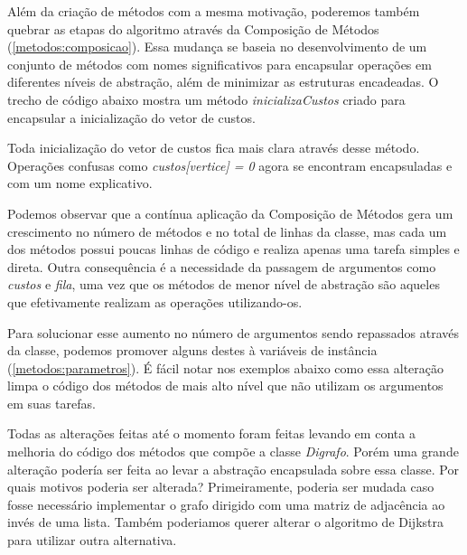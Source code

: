 

Além da criação de métodos com a mesma motivação, poderemos também quebrar as etapas do algoritmo através da Composição 
de Métodos (\ref{metodos:composicao}). Essa mudança se baseia no desenvolvimento de um conjunto de métodos com nomes 
significativos para encapsular operações em diferentes níveis de abstração, além de minimizar as estruturas encadeadas.
O trecho de código abaixo mostra um método \textit{inicializaCustos} criado para encapsular a inicialização do vetor de 
custos.



Toda inicialização do vetor de custos fica mais clara através desse método. Operações confusas como 
\textit{custos[vertice] = 0} agora se encontram encapsuladas e com um nome explicativo.

Podemos observar que a contínua aplicação da Composição de Métodos gera um crescimento no número de métodos e no total de 
linhas da classe, mas cada um dos métodos possui poucas linhas de código e realiza apenas uma tarefa simples e direta. 
Outra consequência é a necessidade da passagem de argumentos como \textit{custos} e \textit{fila}, uma vez que os métodos 
de menor nível de abstração são aqueles que efetivamente realizam as operações utilizando-os.

Para solucionar esse aumento no número de argumentos sendo repassados através da classe, podemos promover alguns destes à 
variáveis de instância (\ref{metodos:parametros}). É fácil notar nos exemplos abaixo como essa alteração limpa o código 
dos métodos de mais alto nível que não utilizam os argumentos em suas tarefas.



Todas as alterações feitas até o momento foram feitas levando em conta a melhoria do código dos métodos que compõe a 
classe \textit{Digrafo}. Porém uma grande alteração podería ser feita ao levar a abstração encapsulada sobre essa classe.
Por quais motivos poderia ser alterada? Primeiramente, poderia ser mudada caso fosse necessário implementar o grafo 
dirigido com uma matriz de adjacência ao invés de uma lista. Também poderiamos querer alterar o algoritmo de Dijkstra 
para utilizar outra alternativa.

